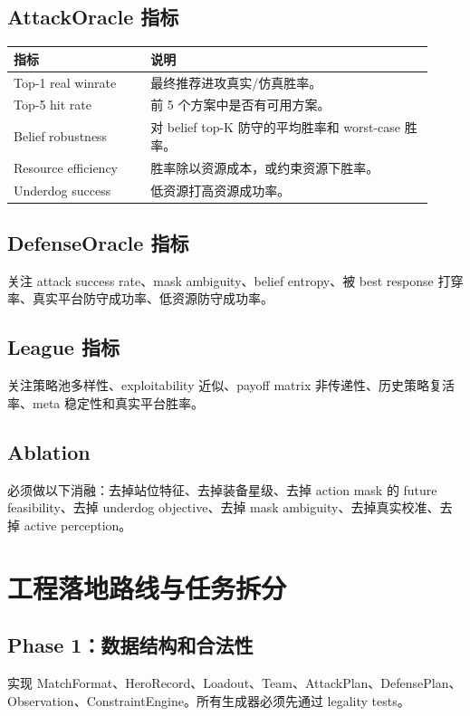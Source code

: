 \documentclass[UTF8,12pt,openany]{ctexbook}
\begin{document}
\section{AttackOracle 指标}
\begin{longtable}{p{0.30\linewidth}p{0.62\linewidth}}
\toprule
指标 & 说明 \\
\midrule
Top-1 real winrate & 最终推荐进攻真实/仿真胜率。\\
Top-5 hit rate & 前 5 个方案中是否有可用方案。\\
Belief robustness & 对 belief top-K 防守的平均胜率和 worst-case 胜率。\\
Resource efficiency & 胜率除以资源成本，或约束资源下胜率。\\
Underdog success & 低资源打高资源成功率。\\
\bottomrule
\end{longtable}

\section{DefenseOracle 指标}
关注 attack success rate、mask ambiguity、belief entropy、被 best response 打穿率、真实平台防守成功率、低资源防守成功率。

\section{League 指标}
关注策略池多样性、exploitability 近似、payoff matrix 非传递性、历史策略复活率、meta 稳定性和真实平台胜率。

\section{Ablation}
必须做以下消融：去掉站位特征、去掉装备星级、去掉 action mask 的 future feasibility、去掉 underdog objective、去掉 mask ambiguity、去掉真实校准、去掉 active perception。


\chapter{工程落地路线与任务拆分}

\section{Phase 1：数据结构和合法性}
实现 MatchFormat、HeroRecord、Loadout、Team、AttackPlan、DefensePlan、Observation、ConstraintEngine。所有生成器必须先通过 legality tests。
\end{document}
